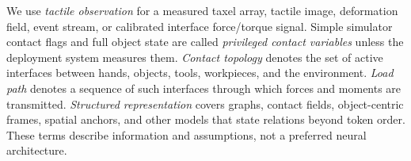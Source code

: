 We use \emph{tactile observation} for a measured taxel array, tactile image,
deformation field, event stream, or calibrated interface force/torque signal.
Simple simulator contact flags and full object state are called \emph{privileged
contact variables} unless the deployment system measures them. \emph{Contact
topology} denotes the set of active interfaces between hands, objects, tools,
workpieces, and the environment. \emph{Load path} denotes a sequence of such
interfaces through which forces and moments are transmitted. \emph{Structured
representation} covers graphs, contact fields, object-centric frames, spatial
anchors, and other models that state relations beyond token order. These terms
describe information and assumptions, not a preferred neural architecture.
